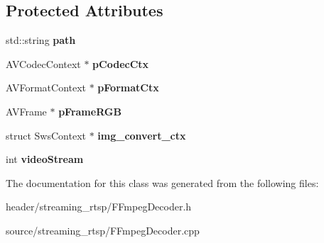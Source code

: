 \subsection*{Protected Attributes}
\begin{DoxyCompactItemize}
\item 
\mbox{\label{class_m_e_s_a_i_1_1_f_fmpeg_decoder_a04c74d07cfc273de1f6cc719c4560830}} 
std\+::string {\bfseries path}
\item 
\mbox{\label{class_m_e_s_a_i_1_1_f_fmpeg_decoder_abdd6372101e492c581be900e600f4eec}} 
A\+V\+Codec\+Context $\ast$ {\bfseries p\+Codec\+Ctx}
\item 
\mbox{\label{class_m_e_s_a_i_1_1_f_fmpeg_decoder_a514e4015809c9fea0553b256b2b1ed47}} 
A\+V\+Format\+Context $\ast$ {\bfseries p\+Format\+Ctx}
\item 
\mbox{\label{class_m_e_s_a_i_1_1_f_fmpeg_decoder_a1ea3e6e36bf3949b1821b9801a028310}} 
A\+V\+Frame $\ast$ {\bfseries p\+Frame\+R\+GB}
\item 
\mbox{\label{class_m_e_s_a_i_1_1_f_fmpeg_decoder_a6a1d6f5e64e0559629385f53119e7768}} 
struct Sws\+Context $\ast$ {\bfseries img\+\_\+convert\+\_\+ctx}
\item 
\mbox{\label{class_m_e_s_a_i_1_1_f_fmpeg_decoder_a825efecc65e8731d027779ee56cc633d}} 
int {\bfseries video\+Stream}
\end{DoxyCompactItemize}


The documentation for this class was generated from the following files\+:\begin{DoxyCompactItemize}
\item 
header/streaming\+\_\+rtsp/F\+Fmpeg\+Decoder.\+h\item 
source/streaming\+\_\+rtsp/F\+Fmpeg\+Decoder.\+cpp\end{DoxyCompactItemize}
